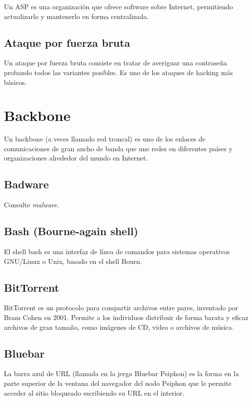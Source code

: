 Un ASP es una organización que ofrece software sobre Internet,
permitiendo actualizarlo y mantenerlo en forma centralizada.

\subsection{Ataque por fuerza bruta}\label{ataque-por-fuerza-bruta}

Un ataque por fuerza bruta consiste en tratar de averiguar una
contraseña probando todos las variantes posibles. Es uno de los ataques
de hacking más básicos.

\section{Backbone}\label{backbone}

Un backbone (a veces llamado red troncal) es uno de los enlaces de
comunicaciones de gran ancho de banda que une redes en diferentes países
y organizaciones alrededor del mundo en Internet.

\subsection{Badware}\label{badware}

Consulte \emph{malware}.

\subsection{Bash (Bourne-again shell)}\label{bash-bourne-again-shell}

El shell bash es una interfaz de línea de comandos para sistemas
operativos GNU/Linux o Unix, basado en el shell Bourn.

\subsection{BitTorrent}\label{bittorrent}

BitTorrent es un protocolo para compartir archivos entre pares,
inventado por Bram Cohen en 2001. Permite a los individuos distribuir de
forma barata y eficaz archivos de gran tamaño, como imágenes de CD,
video o archivos de música.

\subsection{Bluebar}\label{bluebar}

La barra azul de URL (llamada en la jerga Bluebar Psiphon) es la forma
en la parte superior de la ventana del navegador del nodo Psiphon que le
permite acceder al sitio bloqueado escribiendo su URL en el interior.

